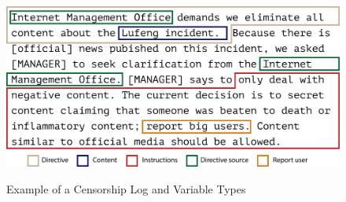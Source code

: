 \documentclass[12pt]{article}
\begin{document}
\begin{CJK*}{UTF8}{gbsn}
{
\begin{figure}[H]
	\centering
	\caption{Example of a Censorship Log and Variable Types}
	\includegraphics[width=\textwidth]{figures/log_example.pdf}\\
	\label{censorship_log}
\end{figure}
}


\end{CJK*}
\end{document}
